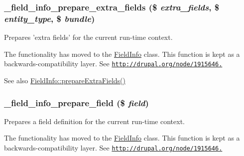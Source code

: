 \hypertarget{group__field__info_ga27575a75b302b0b030e021346c71e857}{
\subsubsection[{\_\-field\_\-info\_\-prepare\_\-extra\_\-fields}]{\setlength{\rightskip}{0pt plus 5cm}\_\-field\_\-info\_\-prepare\_\-extra\_\-fields (\$ {\em extra\_\-fields}, \/  \$ {\em entity\_\-type}, \/  \$ {\em bundle})}}
\label{group__field__info_ga27575a75b302b0b030e021346c71e857}
Prepares 'extra fields' for the current run-\/time context.

The functionality has moved to the \hyperlink{classFieldInfo}{FieldInfo} class. This function is kept as a backwards-\/compatibility layer. See \href{http://drupal.org/node/1915646.}{\tt http://drupal.org/node/1915646.}

\begin{DoxySeeAlso}{See also}
\hyperlink{classFieldInfo_af1a6d10db6c9fc2d4942108edfd9c31f}{FieldInfo::prepareExtraFields()} 
\end{DoxySeeAlso}
\hypertarget{group__field__info_ga05abfb7bf7b8a44e2a74bba47f15004f}{
\subsubsection[{\_\-field\_\-info\_\-prepare\_\-field}]{\setlength{\rightskip}{0pt plus 5cm}\_\-field\_\-info\_\-prepare\_\-field (\$ {\em field})}}
\label{group__field__info_ga05abfb7bf7b8a44e2a74bba47f15004f}
Prepares a field definition for the current run-\/time context.

The functionality has moved to the \hyperlink{classFieldInfo}{FieldInfo} class. This function is kept as a backwards-\/compatibility layer. See \href{http://drupal.org/node/1915646.}{\tt http://drupal.org/node/1915646.}

